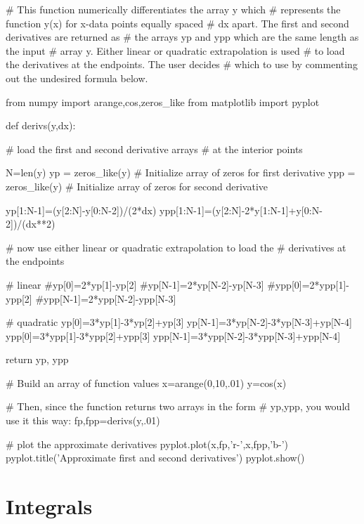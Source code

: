 \begin{codeexample}[derivs.py]
\begin{VerbatimOut}{\listingFile}

# This function numerically differentiates the array y which
# represents the function y(x) for x-data points equally spaced
# dx apart.  The first and second derivatives are returned as
# the arrays yp and ypp which are the same length as the input
# array y.  Either linear or quadratic extrapolation is used
# to load the derivatives at the endpoints.  The user decides
# which to use by commenting out the undesired formula below.

from numpy import arange,cos,zeros_like
from matplotlib import pyplot

def derivs(y,dx):

    # load the first and second derivative arrays
    # at the interior points

    N=len(y)
    yp = zeros_like(y)  # Initialize array of zeros for first derivative
    ypp = zeros_like(y)  # Initialize array of zeros for second derivative

    yp[1:N-1]=(y[2:N]-y[0:N-2])/(2*dx)
    ypp[1:N-1]=(y[2:N]-2*y[1:N-1]+y[0:N-2])/(dx**2)
    
    # now use either linear or quadratic extrapolation to load the
    # derivatives at the endpoints


    # linear
    #yp[0]=2*yp[1]-yp[2]
    #yp[N-1]=2*yp[N-2]-yp[N-3]
    #ypp[0]=2*ypp[1]-ypp[2]
    #ypp[N-1]=2*ypp[N-2]-ypp[N-3]

    # quadratic
    yp[0]=3*yp[1]-3*yp[2]+yp[3]
    yp[N-1]=3*yp[N-2]-3*yp[N-3]+yp[N-4]
    ypp[0]=3*ypp[1]-3*ypp[2]+ypp[3]
    ypp[N-1]=3*ypp[N-2]-3*ypp[N-3]+ypp[N-4]

    return yp, ypp


# Build an array of function values
x=arange(0,10,.01)
y=cos(x)

# Then, since the function returns two arrays in the form
# yp,ypp, you would use it this way:
fp,fpp=derivs(y,.01)

# plot the approximate derivatives
pyplot.plot(x,fp,'r-',x,fpp,'b-') 
pyplot.title('Approximate first and second derivatives')
pyplot.show()
\end{VerbatimOut}
\end{codeexample}

\section{Integrals}

